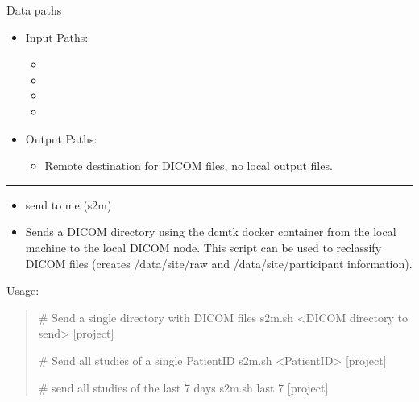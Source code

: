 \documentclass[letterpaper,10pt,english]{sphinxmanual}
\begin{document}
\sphinxAtStartPar
Data paths
\begin{itemize}
\item {} 
\sphinxAtStartPar
Input Paths:
\begin{itemize}
\item {} 
\sphinxAtStartPar
{}

\item {} 
\sphinxAtStartPar
{}

\item {} 
\sphinxAtStartPar
{}

\item {} 
\sphinxAtStartPar
{}

\end{itemize}

\item {} 
\sphinxAtStartPar
Output Paths:
\begin{itemize}
\item {} 
\sphinxAtStartPar
Remote destination for DICOM files, no local output files.

\end{itemize}

\end{itemize}


\bigskip\hrule\bigskip

\begin{itemize}
\item {} 
\sphinxAtStartPar
send to me (s2m)

\item {} 
\sphinxAtStartPar
Sends a DICOM directory using the dcmtk docker container from the local machine to the local DICOM node. This script can be used to re\sphinxhyphen{}classify DICOM files (creates /data/site/raw and /data/site/participant information).

\end{itemize}

\sphinxAtStartPar
Usage:
\begin{quote}

\sphinxAtStartPar
\# Send a single directory with DICOM files
s2m.sh \textless{}DICOM directory to send\textgreater{} {[}project{]}

\sphinxAtStartPar
\# Send all studies of a single PatientID
s2m.sh \textless{}PatientID\textgreater{} {[}project{]}

\sphinxAtStartPar
\# send all studies of the last 7 days
s2m.sh last 7 {[}project{]}
\end{quote}
\end{document}
